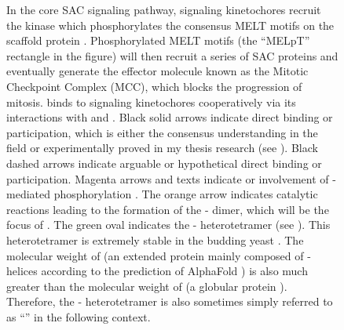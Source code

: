 \begin{figure}
    \noindent\justifying In the core SAC signaling pathway, signaling kinetochores recruit the kinase  which phosphorylates the consensus MELT motifs on the scaffold protein . Phosphorylated MELT motifs (the ``MELpT'' rectangle in the figure) will then recruit a series of SAC proteins and eventually generate the effector molecule known as the Mitotic Checkpoint Complex (MCC), which blocks the progression of mitosis.  binds to signaling kinetochores cooperatively via its interactions with  and  \cite{BUB1-CDC20-MAD1, Tripartite}. Black solid arrows indicate direct binding or participation, which is either the consensus understanding in the field \cite{MPS1Localization_Ji, MPS1Localization_Hiruma, RecombinantKNL1, MELTActivity, BubBiochem, BubR1TwoPools, BUB1CD1-MAD1CStructure, Faesen2017, BUB1-CDC20-MAD1, Tripartite} or experimentally proved in my thesis research (see ). Black dashed arrows indicate arguable \cite{BubBiochem, BubR1TwoPools} or hypothetical direct binding or participation. Magenta arrows and texts indicate  or involvement of -mediated phosphorylation \cite{Ji2017eLife}. The orange arrow indicates catalytic reactions leading to the formation of the - dimer, which will be the focus of . The green  oval indicates the - heterotetramer (see ). This heterotetramer is extremely stable in the budding yeast \cite{StableHeterotetramer}. The molecular weight of  (an extended protein mainly composed of \textalpha{}-helices according to the prediction of AlphaFold \cite{AlphaFold}) is also much greater than the molecular weight of  (a globular protein \cite{Structure1GO4}). Therefore, the - heterotetramer is also sometimes simply referred to as ``'' in the following context.
    \label{CoreSAC}
\end{figure}

